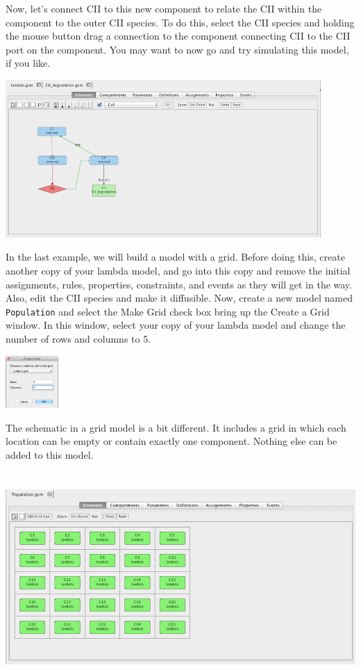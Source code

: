 \documentclass[titlepage,11pt]{article}
\begin{document}
Now, let's connect CII to this new component to relate the CII within the component to the outer CII species.  To do this, select the CII species and holding the mouse button drag a connection to the component connecting CII to the CII port on the component.  
You may want to now go and try simulating this model, if you like.

\begin{center}
\includegraphics[height=60mm]{screenshots/addPort}
\end{center}

In the last example, we will build a model with a grid.  Before doing this, create another copy of your lambda model, and go into this copy and remove the initial assignments, rules, properties, constraints, and events as they will get in the way.  Also, edit the CII species and make it diffusible.  Now, create a new model named {\tt Population} and select the Make Grid check box bring up the Create a Grid window.  In this window, select your copy of your lambda model and change the number of rows and columns to 5.  

\begin{center}
\includegraphics[height=20mm]{screenshots/createGrid}
\end{center}

The schematic in a grid model is a bit different.  It includes a grid in which each location can be empty or contain exactly one component.  Nothing else can be added to this model.

\begin{center}
\includegraphics[height=80mm]{screenshots/gridModel}
\end{center}
\end{document}
